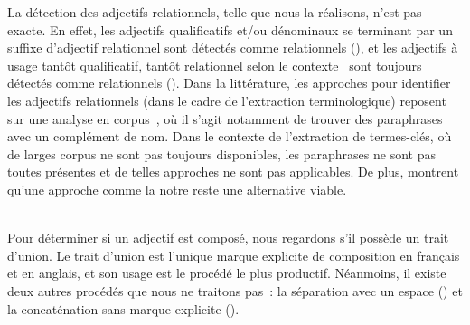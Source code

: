       La détection des adjectifs relationnels, telle que nous la réalisons,
      n'est pas exacte. En effet, les adjectifs qualificatifs et/ou dénominaux
      se terminant par un suffixe d'adjectif relationnel sont détectés comme
      relationnels (), et les adjectifs à usage tantôt
      qualificatif, tantôt relationnel selon le
      contexte~\cite{maniez2009denominaladjectives} sont toujours détectés comme
      relationnels (). Dans la littérature, les approches pour
      identifier les adjectifs relationnels (dans le cadre de l'extraction
      terminologique) reposent sur une analyse en
      corpus~\cite{daille2000relationaladjectives,maniez2005automaticrelationaladjectiveidentification,harastani2013relationaladjectivetranslation},
      où il s'agit notamment de trouver des paraphrases avec un complément de
      nom. Dans le contexte de l'extraction de termes-clés, où de larges corpus
      ne sont pas toujours disponibles, les paraphrases ne sont pas toutes
      présentes et de telles approches ne sont pas applicables. De plus,
       montrent qu'une
      approche comme la notre reste une alternative viable.

      ~\\Pour déterminer si un adjectif est composé, nous regardons s'il possède
      un trait d'union. Le trait d'union est l'unique marque explicite de
      composition en français et en anglais, et son usage est le procédé le plus
      productif. Néanmoins, il existe deux autres procédés que nous ne traitons
      pas~: la séparation avec un espace () et la concaténation
      sans marque explicite ().

